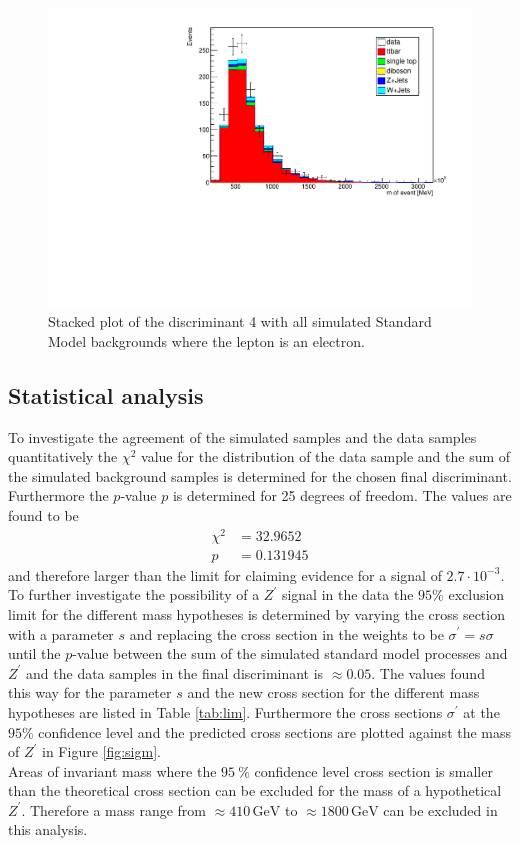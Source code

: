 \begin{figure}[tb]
  \centering
  \includegraphics[width=.6\textwidth]{plots/comparism/m_event.pdf}
  \caption{Stacked plot of the discriminant 4 with all simulated Standard Model backgrounds where the lepton
  is an electron.}
  \label{fig:7}
\end{figure}


\subsection{Statistical analysis}
To investigate the agreement of the simulated samples and the data samples quantitatively the $\chi^2$ value for the distribution of the
data sample and the sum of the simulated background samples is determined for the chosen final discriminant. Furthermore the $p$-value $p$ is
determined for 25 degrees of freedom.
The values are found to be
\begin{align*}
  \chi^2 &= 32.9652 \\
  p &= 0.131945
\end{align*}
and therefore larger than the limit for claiming evidence for a signal of $2.7 \cdot 10^{-3}$.
To further investigate the possibility of a $Z^\prime$ signal in the data the $95 \%$ exclusion limit for the different mass hypotheses
is determined by varying the cross section with a parameter $s$ and replacing the cross section in the weights to be $\sigma^\prime = s \sigma$
until the $p$-value between the sum of the simulated standard model processes and $Z^\prime$ and the data samples in the final discriminant is
$\approx 0.05$. The values found this way for the parameter $s$ and the new cross section for the different mass hypotheses are listed in Table \ref{tab:lim}.
Furthermore the cross sections $\sigma^\prime$ at the $95 \%$ confidence level and the predicted cross sections are plotted against the mass of $Z^\prime$
in Figure \ref{fig:sigm}.\\
Areas of invariant mass where the $\SI{95}{\percent}$ confidence level cross section is smaller than the theoretical cross section can be excluded for the mass of 
a hypothetical $Z^\prime$. Therefore a mass range from $\approx 410 \, \si{\giga\eV}$ to $\approx 1800 \, \si{\giga\eV}$ can be excluded in this analysis.


